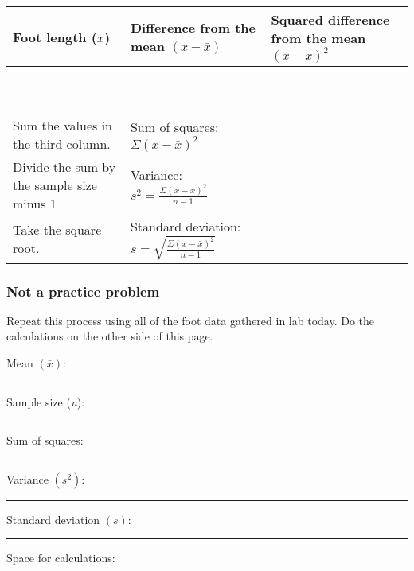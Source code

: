 \documentclass[12pt, addpoints, hidelinks]{exam}
\begin{document}
\begin{questions}
\begin{tabular}{@{}|L{1in}|L{2in}|L{2in}|@{}}
\hline
Foot length ($x$)	& Difference from the mean $(x-\bar{x})$	& Squared difference from the mean $(x-\bar{x})^2$ \tabularnewline
\hline
 	&		& \tabularnewline[1em]
\hline
	&		& \tabularnewline[1em]
\hline
	&		& \tabularnewline[1em]
\hline
	&		& \tabularnewline[1em]
\hline
	&		& \tabularnewline[1em]
\hline
	&		& \tabularnewline[1em]
\hline
	&		& \tabularnewline[1em]
\hline
	&		& \tabularnewline[1em]
\hline
	&		& \tabularnewline[1em]
\hline
	&		& \tabularnewline[1em]
\hline
Sum the values in the third column.	&	Sum of squares: $\Sigma{(x-\bar{x})^2}$ & \tabularnewline[1em]
\hline
Divide the sum by the sample size minus 1	&	Variance: $s^2 = \frac{\Sigma{(x-\bar{x})^2}}{n-1}$ & \tabularnewline[1em]
\hline
Take the square root.	&	Standard deviation: $s = \sqrt{\frac{\Sigma{(x-\bar{x})^2}}{n-1}}$ & \tabularnewline[1em]
\hline
\end{tabular}

\vspace*{\baselineskip}

\subsubsection*{Not a practice problem}

\question[8]
Repeat this process using all of the foot data gathered in lab today. Do the calculations on the other side of this page.

\end{questions}

\newpage

Mean $(\bar{x})$: \rule{1in}{0.4pt} 

\vspace*{\baselineskip}

Sample size (\emph{n}): \rule{1in}{0.4pt}

\vspace*{\baselineskip}

Sum of squares: \rule{1in}{0.4pt}

\vspace*{\baselineskip}

Variance $(s^2)$: \rule{1in}{0.4pt}

\vspace*{\baselineskip}

Standard deviation $(s)$: \rule{1in}{0.4pt}

\vspace*{\baselineskip}
Space for calculations:
\end{document}

